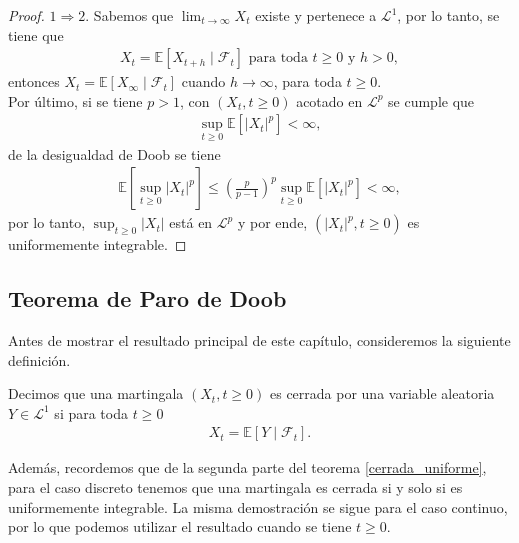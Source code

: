 \begin{proof}
$1 \Rightarrow 2$. Sabemos que $\lim_{t \rightarrow \infty} X_t$ existe y pertenece a $\mathcal{L}^{1}$, por lo tanto, se tiene que
\begin{align*}
X_t = \mathbb{E}[X_{t + h} \mid \mathcal{F}_t] \text{ para toda } t \geq 0 \text{ y } h > 0,
\end{align*}
entonces $X_t = \mathbb{E}[X_{\infty} \mid \mathcal{F}_t]$ cuando $h \rightarrow \infty$, para toda $t \geq 0$. \\

Por último, si se tiene $p > 1$, con $(X_t, t \geq 0)$ acotado en $\mathcal{L}^{p}$ se cumple que 
\begin{align*}
\sup_{t \geq 0} \mathbb{E}[|X_t|^{p}] < \infty,
\end{align*}
de la desigualdad de Doob se tiene
\begin{align*}
\mathbb{E} \left[ \sup_{t \geq 0} |X_t|^{p} \right] \leq \left( \frac{p}{p-1} \right)^{p} \sup_{t \geq 0} \mathbb{E}[|X_t|^{p}] < \infty,
\end{align*}
por lo tanto, $\sup_{t \geq 0} |X_t|$ está en $\mathcal{L}^{p}$ y por ende, $(|X_t|^{p}, t \geq 0)$ es uniformemente integrable.
\end{proof}

\subsection{Teorema de Paro de Doob}

Antes de mostrar el resultado principal de este capítulo, consideremos la siguiente definición.

\begin{definition}
Decimos que una martingala $(X_t, t \geq 0)$ es cerrada por una variable aleatoria $Y \in \mathcal{L}^{1}$ si para toda $t \geq 0$
\begin{align*}
X_t = \mathbb{E}[Y \mid \mathcal{F}_t].
\end{align*}
\end{definition}

Además, recordemos que de la segunda parte del teorema \ref{cerrada_uniforme}, para el caso discreto tenemos que una martingala es cerrada si y solo si es uniformemente integrable. La misma demostración se sigue para el caso continuo, por lo que podemos utilizar el resultado cuando se tiene $t \geq 0$.


